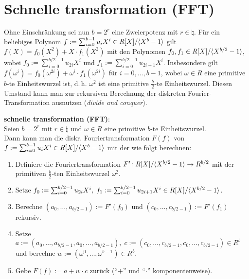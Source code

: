 \pagebreak

\section{%
    Schnelle transformation (FFT)%
}

Ohne Einschränkung sei nun $b = 2^r$ eine Zweierpotenz mit $r \in \natural$.
Für ein beliebiges Polynom $f := \sum_{i=0}^{b-1} u_i X^i \in R[X]/\langle X^b - 1\rangle$ gilt
$f(X) = f_0(X^2) + X \cdot f_1(X^2)$ mit den Polynomen
$f_0, f_1 \in R[X]/\langle X^{b/2} - 1\rangle$,
wobei $f_0 := \sum_{i=0}^{b/2-1} u_{2i} X^i$ und
$f_1 := \sum_{i=0}^{b/2-1} u_{2i+1} X^i$.
Insbesondere gilt $f(\omega^i) = f_0(\omega^{2i}) + \omega^i \cdot f_1(\omega^{2i})$
für $i = 0, \dotsc, b - 1$,
wobei $\omega \in R$ eine primitive $b$-te Einheitswurzel ist,
d.\,h. $\omega^2$ ist eine primitive $\frac{b}{2}$-te Einheitswurzel.
Diesen Umstand kann man zur rekursiven Berechnung der diskreten Fourier-Transformation ausnutzen
(\emph{divide and conquer}).

\textbf{schnelle transformation (FFT)}:\\
Seien $b = 2^r$ mit $r \in \natural$ und $\omega \in R$ eine primitive $b$-te Einheitswurzel.\\
Dann kann man die diskr. Fouriertransformation $F(f)$ von
$f := \sum_{i=0}^{b-1} u_i X^i \in R[X]/\langle X^b - 1\rangle$
mit der  wie folgt berechnen:
\begin{enumerate}
    \item
    Definiere die Fouriertransformation $F'\colon R[X]/\langle X^{b/2} - 1\rangle \to R^{b/2}$
    mit der primitiven $\frac{b}{2}$-ten Einheitswurzel $\omega^2$.

    \item
    Setze
    $f_0 := \sum_{i=0}^{b/2-1} u_{2i} X^i,\;
    f_1 := \sum_{i=0}^{b/2-1} u_{2i+1} X^i \in R[X]/\langle X^{b/2} - 1\rangle$.

    \item
    Berechne $(a_0, \dotsc, a_{b/2-1}) := F'(f_0)$ und
    $(c_0, \dotsc, c_{b/2-1}) := F'(f_1)$ rekursiv.

    \item
    Setze $a := (a_0, \dotsc, a_{b/2-1}, a_0, \dotsc, a_{b/2-1}),\;
    c := (c_0, \dotsc, c_{b/2-1}, c_0, \dotsc, c_{b/2-1}) \in R^b$ und berechne
    $w := (\omega^0, \dotsc, \omega^{b-1}) \in R^b$.

    \item
    Gebe $F(f) := a + w \cdot c$ zurück ("`$+$"' und "`$\cdot$"' komponentenweise).
\end{enumerate}

